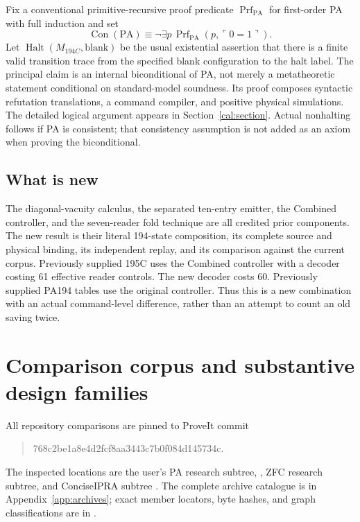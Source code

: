 \documentclass[11pt]{article}
\newcommand{\PA}{\mathrm{PA}}
\newcommand{\Con}{\operatorname{Con}}
\newcommand{\Halt}{\operatorname{Halt}}
\newcommand{\code}[1]{\ulcorner #1\urcorner}
\newcommand{\file}[1]{\texttt{\detokenize{#1}}}
\newcommand{\MC}{M_{194C}}
\theoremstyle{definition}
\theoremstyle{remark}
\begin{document}
Fix a conventional primitive-recursive proof predicate
$\operatorname{Prf}_{\PA}$ for first-order PA with full induction and set
\[
 \Con(\PA)\equiv\neg\exists p\,
       \operatorname{Prf}_{\PA}(p,\code{0=1}).
\]
Let $\Halt(\MC,\mathrm{blank})$ be the usual existential assertion that
there is a finite valid transition trace from the specified blank
configuration to the halt label. The principal claim is an internal
biconditional of PA, not merely a metatheoretic statement conditional on
standard-model soundness. Its proof composes syntactic refutation
translations, a command compiler, and positive physical simulations.
The detailed logical argument appears in Section~\ref{cal:section}.
Actual nonhalting follows if PA is consistent; that consistency assumption
is not added as an axiom when proving the biconditional.

\subsection{What is new}

The diagonal-vacuity calculus, the separated ten-entry emitter, the
Combined controller, and the seven-reader fold technique are all credited
prior components. The new result is their literal 194-state composition,
its complete source and physical binding, its independent replay, and its
comparison against the current corpus. Previously supplied 195C uses the
Combined controller with a decoder costing 61 effective reader controls.
The new decoder costs 60. Previously supplied PA194 tables use the original
controller. Thus this is a new combination with an actual command-level
difference, rather than an attempt to count an old saving twice.

\section{Comparison corpus and substantive design families}
\label{sec:comparison}

All repository comparisons are pinned to ProveIt commit
\begin{quote}\small\ttfamily 768c2be1a8e4d2fcf8aa3443c7b0f084d145734c.\end{quote}
The inspected locations are the user's PA research subtree,
\file{docs/incoming}, ZFC research subtree, and ConciseIPRA subtree
\cite{repo,paindex,incoming,zfc,ipra}. The complete archive catalogue is in
Appendix~\ref{app:archives}; exact member locators, byte hashes, and graph
classifications are in \file{comparison/}.
\end{document}
